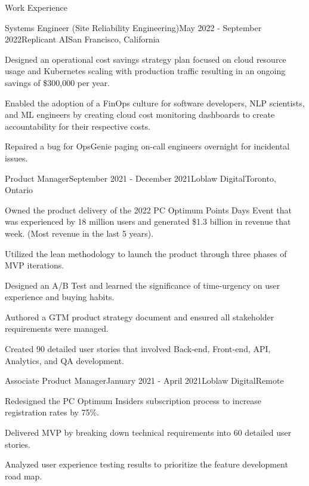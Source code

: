 \documentclass{resume} %
\begin{document}

\begin{rSection}{Work Experience}

\begin{rSubsection}{Systems Engineer (Site Reliability Engineering)}{May 2022 - September 2022}{Replicant AI}{San Francisco, California}
\item Designed an operational cost savings strategy plan focused on cloud resource usage and Kubernetes scaling with production traffic resulting in an ongoing savings of \$300,000 per year.
\item Enabled the adoption of a FinOps culture for software developers, NLP scientists, and ML engineers by creating cloud cost monitoring dashboards to create accountability for their respective costs.
\item Repaired a bug for OpsGenie paging on-call engineers overnight for incidental issues.
\end{rSubsection}

\begin{rSubsection}{Product Manager}{September 2021 - December 2021}{Loblaw Digital}{Toronto, Ontario}
\item Owned the product delivery of the 2022 PC Optimum Points Days Event that was experienced by 18 million users and generated \$1.3 billion in revenue that week. (Most revenue in the last 5 years).
\item Utilized the lean methodology to launch the product through three phases of MVP iterations. 
\item Designed an A/B Test and learned the significance of time-urgency on user experience and buying habits.
\item Authored a GTM product strategy document and ensured all stakeholder requirements were managed.
\item Created 90 detailed user stories that involved Back-end, Front-end, API, Analytics, and QA development.
\end{rSubsection}


\begin{rSubsection}{Associate Product Manager}{January 2021 - April 2021}{Loblaw Digital}{Remote}
\item Redesigned the PC Optimum Insiders subscription process to increase registration rates by 75\%.
\item Delivered MVP by breaking down technical requirements into 60 detailed user stories.
\item Analyzed user experience testing results to prioritize the feature development road map.
\end{rSubsection}


\end{rSection}
\end{document}
